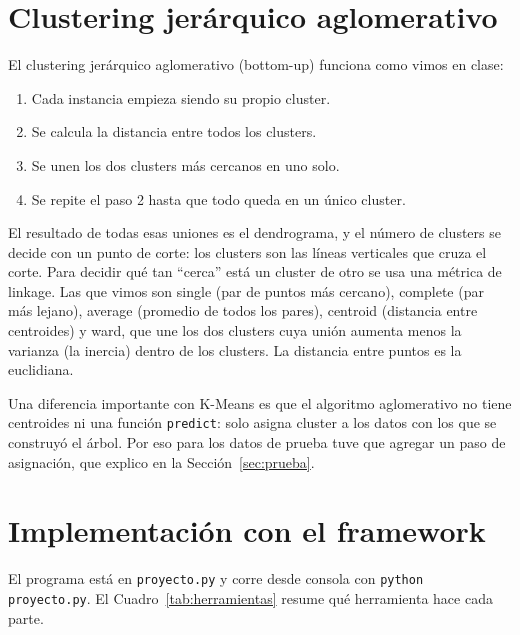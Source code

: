 \documentclass[11pt,a4paper]{article}
\begin{document}
\section{Clustering jerárquico aglomerativo}

El clustering jerárquico aglomerativo (bottom-up) funciona como vimos en clase:

\begin{enumerate}
  \item Cada instancia empieza siendo su propio cluster.
  \item Se calcula la distancia entre todos los clusters.
  \item Se unen los dos clusters más cercanos en uno solo.
  \item Se repite el paso 2 hasta que todo queda en un único cluster.
\end{enumerate}

El resultado de todas esas uniones es el dendrograma, y el número de clusters se decide con un punto de corte: los clusters son las líneas verticales que cruza el corte. Para decidir qué tan ``cerca'' está un cluster de otro se usa una métrica de linkage. Las que vimos son single (par de puntos más cercano), complete (par más lejano), average (promedio de todos los pares), centroid (distancia entre centroides) y ward, que une los dos clusters cuya unión aumenta menos la varianza (la inercia) dentro de los clusters. La distancia entre puntos es la euclidiana.

Una diferencia importante con K-Means es que el algoritmo aglomerativo no tiene centroides ni una función \texttt{predict}: solo asigna cluster a los datos con los que se construyó el árbol. Por eso para los datos de prueba tuve que agregar un paso de asignación, que explico en la Sección~\ref{sec:prueba}.

\section{Implementación con el framework}

El programa está en \texttt{proyecto.py} y corre desde consola con \texttt{python proyecto.py}. El Cuadro~\ref{tab:herramientas} resume qué herramienta hace cada parte.
\end{document}
